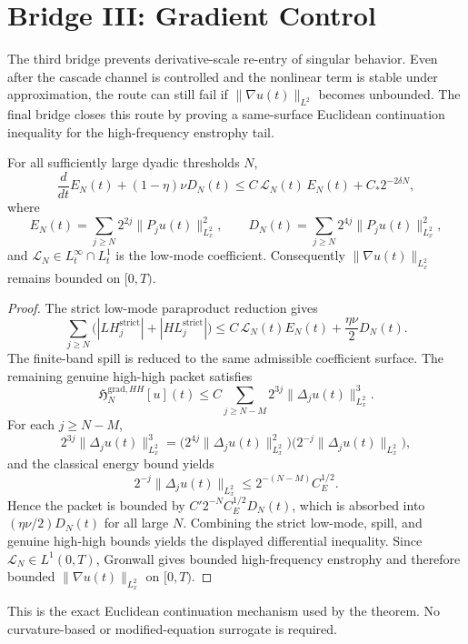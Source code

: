 \section{Bridge III: Gradient Control}

The third bridge prevents derivative-scale re-entry of singular behavior. Even after the cascade channel is controlled and the nonlinear term is stable under approximation, the route can still fail if \(\|\nabla u(t)\|_{L^2}\) becomes unbounded. The final bridge closes this route by proving a same-surface Euclidean continuation inequality for the high-frequency enstrophy tail.

\begin{proposition}
\label{prop:gradient-control}
For all sufficiently large dyadic thresholds \(N\),
\[
\frac{d}{dt}E_N(t) + (1-\eta)\nu D_N(t)
\le
C\,\mathcal{L}_N(t)\,E_N(t) + C_\ast 2^{-2\delta N},
\]
where
\[
E_N(t)=\sum_{j\ge N}2^{2j}\|P_j u(t)\|_{L^2_x}^2,
\qquad
D_N(t)=\sum_{j\ge N}2^{4j}\|P_j u(t)\|_{L^2_x}^2,
\]
and \(\mathcal{L}_N\in L^\infty_t\cap L^1_t\) is the low-mode coefficient. Consequently \(\|\nabla u(t)\|_{L^2_x}\) remains bounded on \([0,T)\).
\end{proposition}

\begin{proof}
The strict low-mode paraproduct reduction gives
\[
\sum_{j\ge N}\bigl(|LH_j^{\mathrm{strict}}|+|HL_j^{\mathrm{strict}}|\bigr)
\le
C\,\mathcal{L}_N(t)E_N(t)+\frac{\eta\nu}{2}D_N(t).
\]
The finite-band spill is reduced to the same admissible coefficient surface. The remaining genuine high-high packet satisfies
\[
\mathfrak{H}^{\mathrm{grad},HH}_{N}[u](t)
\le
C\sum_{j\ge N-M}2^{3j}\|\Delta_j u(t)\|_{L^2_x}^3.
\]
For each \(j\ge N-M\),
\[
2^{3j}\|\Delta_j u(t)\|_{L^2_x}^3
=
\bigl(2^{4j}\|\Delta_j u(t)\|_{L^2_x}^2\bigr)
\bigl(2^{-j}\|\Delta_j u(t)\|_{L^2_x}\bigr),
\]
and the classical energy bound yields
\[
2^{-j}\|\Delta_j u(t)\|_{L^2_x}\le 2^{-(N-M)}C_E^{1/2}.
\]
Hence the packet is bounded by \(C'2^{-N}C_E^{1/2}D_N(t)\), which is absorbed into \((\eta\nu/2)D_N(t)\) for all large \(N\). Combining the strict low-mode, spill, and genuine high-high bounds yields the displayed differential inequality. Since \(\mathcal{L}_N\in L^1(0,T)\), Gronwall gives bounded high-frequency enstrophy and therefore bounded \(\|\nabla u(t)\|_{L^2_x}\) on \([0,T)\).
\end{proof}

This is the exact Euclidean continuation mechanism used by the theorem. No curvature-based or modified-equation surrogate is required.
